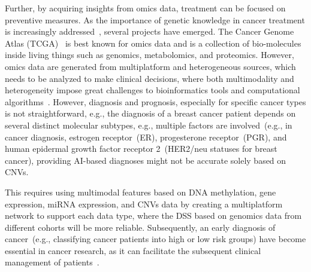 \hspace*{3.5mm} Further, by acquiring insights from omics data, treatment can be focused on preventive measures. As the importance of genetic knowledge in cancer treatment is increasingly addressed~\cite{15Wu}, several projects have emerged. The Cancer Genome Atlas (TCGA)~\cite{tomczak2015cancer} is best known for omics data and is a collection of bio-molecules inside living things such as genomics, metabolomics, and proteomics. However, omics data are generated from multiplatform and heterogeneous sources, which needs to be analyzed to make clinical decisions, where both multimodality and heterogeneity impose great challenges to bioinformatics tools and computational algorithms~\cite{karimACCESS2019,karimBIB2019}. However, diagnosis and prognosis, especially for specific cancer types is not straightforward, e.g., the diagnosis of a breast cancer patient depends on several distinct molecular subtypes, e.g., multiple factors are involved~(e.g., in cancer diagnosis, estrogen receptor~(ER), progesterone receptor~(PGR), and human epidermal growth factor receptor 2~(HER2/neu statuses for breast cancer), providing AI-based diagnoses might not be accurate solely based on CNVs.

\hspace*{3.5mm} This requires using multimodal features based on DNA methylation, gene expression, miRNA expression, and CNVs data by creating a multiplatform network to support each data type, where the DSS based on genomics data from different cohorts will be more reliable. Subsequently, an early diagnosis of cancer~(e.g., classifying cancer patients into high or low risk groups) have become essential in cancer research, as it can facilitate the subsequent clinical management of patients~\cite{kourou2015machine}.  

